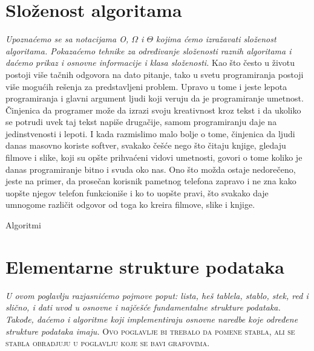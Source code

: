 \documentclass{memoir}
\begin{document}
\chapter{Složenost algoritama}
\emph{Upoznaćemo se sa notacijama O, $\varOmega$ i $\varTheta$ kojima ćemo izražavati složenost algoritama. Pokazaćemo tehnike za
određivanje složenosti raznih algoritama i daćemo prikaz i osnovne informacije i klasa složenosti.}
\newpage
Kao što često u životu postoji više tačnih odgovora na dato pitanje, tako u svetu programiranja postoji više mogućih rešenja za predstavljeni problem. Upravo u tome i jeste
lepota programiranja i glavni argument ljudi koji veruju da je programiranje umetnost. Činjenica da programer može da izrazi svoju kreativnost kroz tekst i da ukoliko se potrudi
uvek taj tekst napiše drugačije, samom programiranju daje na jedinstvenosti i lepoti. I kada razmislimo malo bolje o tome, činjenica da ljudi danas masovno koriste softver,
svakako češće nego što čitaju knjige, gledaju filmove i slike, koji su opšte prihvaćeni vidovi umetnosti, govori o tome koliko je danas programiranje bitno i svuda oko nas.
Ono što možda ostaje nedorečeno, jeste na primer, da prosečan korisnik pametnog telefona zapravo i ne zna kako uopšte njegov telefon funkcioniše i ko to uopšte pravi, što svakako
daje umnogome različit odgovor od toga ko kreira filmove, slike i knjige. 

Algoritmi 

\chapter{Elementarne strukture podataka}
\emph{U ovom poglavlju razjasnićemo pojmove poput: lista, heš tablela, stablo, stek, red i slično, i dati uvod u 
osnovne i najčešće
fundamentalne strukture podataka. Takođe, daćemo i algoritme koji implementiraju osnovne naredbe koje određene strukture
podataka imaju.}
\newpage
\textsc{Ovo poglavlje bi trebalo da pomene stabla, ali se stabla obradjuju u poglavlju koje se bavi grafovima.}
\end{document}
